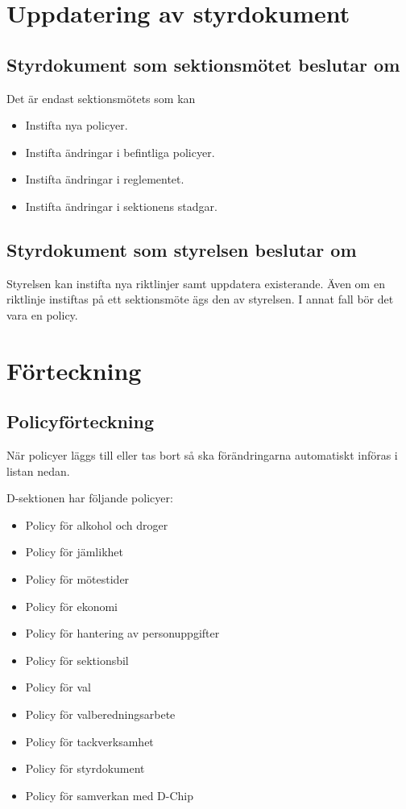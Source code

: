 \documentclass[]{dsekprotokoll}
\begin{document}
\section{Uppdatering av styrdokument}
\subsection{Styrdokument som sektionsmötet beslutar om}
Det är endast sektionsmötets som kan
\begin{itemize}
    \item Instifta nya policyer.
    \item Instifta ändringar i befintliga policyer.
    \item Instifta ändringar i reglementet.
    \item Instifta ändringar i sektionens stadgar.
\end{itemize}

\subsection{Styrdokument som styrelsen beslutar om}
Styrelsen kan instifta nya riktlinjer samt uppdatera existerande. Även om en riktlinje instiftas på ett sektionsmöte ägs den av styrelsen. I annat fall bör det vara en policy.

\section{Förteckning}

\subsection{Policyförteckning}
När policyer läggs till eller tas bort så ska förändringarna automatiskt införas i listan nedan.

D-sektionen har följande policyer:
\begin{itemize}
    \item Policy för alkohol och droger
    \item Policy för jämlikhet
    \item Policy för mötestider
    \item Policy för ekonomi
    \item Policy för hantering av personuppgifter
    \item Policy för sektionsbil
    \item Policy för val
    \item Policy för valberedningsarbete
    \item Policy för tackverksamhet
    \item Policy för styrdokument
    \item Policy för samverkan med D-Chip
\end{itemize}
\end{document}
